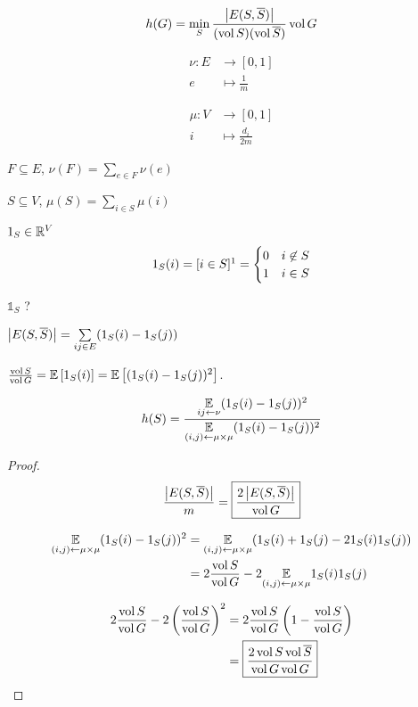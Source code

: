 \[
    h(G) = \min\limits_S \frac{\left\lvert E(S,\overline{S})\right\rvert}{(\operatorname{vol} S)(\operatorname{vol} \overline{S})} \operatorname{vol} G
\]

\[
    \begin{aligned}
        \nu : E&\to [0,1]\\
        e &\mapsto \frac{1}{m}
    \end{aligned}
\]

\[
    \begin{aligned}
        \mu : V&\to [0,1]\\
        i &\mapsto \frac{d_i}{2m}
    \end{aligned}
\]


$F\subseteq E$, $\nu(F) = \sum\limits_{e\in F} \nu(e)$

$S\subseteq V$, $\mu(S)=\sum\limits_{i\in S} \mu(i)$

\begin{notation}
    $1_S \in \mathbb{R}^V$
    \[
        1_S(i) = [i\in S]\footnotemark = \begin{cases}
            0 & i\not\in S\\
            1 & i\in S
        \end{cases}         
    \]
    
    $\mathbb{1}_S$ ?
\end{notation}

$\left\lvert E(S,\overline{S})\right\rvert = \sum\limits_{ij\in E} (1_S(i)-1_S(j))$


$\frac{\operatorname{vol} S}{\operatorname{vol} G} = \mathbb{E}\left[ 1_S(i) \right] = \mathbb{E}\left[ (1_S(i)-1_S(j))^2 \right]$.

\begin{proposition}
    \[
        h(S) = \frac{\underset{ij\leftarrow \nu}{\mathbb{E}}(1_S(i)-1_S(j))^2}{\underset{(i,j)\leftarrow\mu\times\mu}{\mathbb{E}}(1_S(i)-1_S(j))^2}    
    \]
\end{proposition}
\begin{proof}
    \[
        \frac{\left\lvert E(S,\overline{S})\right\rvert}{m} = \boxed{\frac{2\left\lvert E(S,\overline{S})\right\rvert}{\operatorname{vol} G}}
    \]

\[
    \begin{aligned}
        \underset{(i,j)\leftarrow\mu\times\mu}{\mathbb{E}}(1_S(i)-1_S(j))^2 &= \underset{(i,j)\leftarrow\mu\times\mu}{\mathbb{E}}(1_S(i)+1_S(j)-21_S(i)1_S(j))\\
        &= 2 \frac{\operatorname{vol} S}{\operatorname{vol} G} -2\underset{(i,j)\leftarrow\mu\times\mu}{\mathbb{E}}1_S(i)1_S(j)
    \end{aligned}
\]

\[
    \begin{aligned}
        2\frac{\operatorname{vol} S}{\operatorname{vol} G} - 2 \left( \frac{\operatorname{vol} S}{\operatorname{vol} G}\right)^2 &= 2 \frac{\operatorname{vol} S}{\operatorname{vol} G}\left( 1- \frac{\operatorname{vol} S}{\operatorname{vol} G}\right)\\
        &= \boxed{\frac{2 \operatorname{vol} S \operatorname{vol} \overline{S}}{\operatorname{vol} G \operatorname{vol} G}}
    \end{aligned}
\]
\end{proof}

